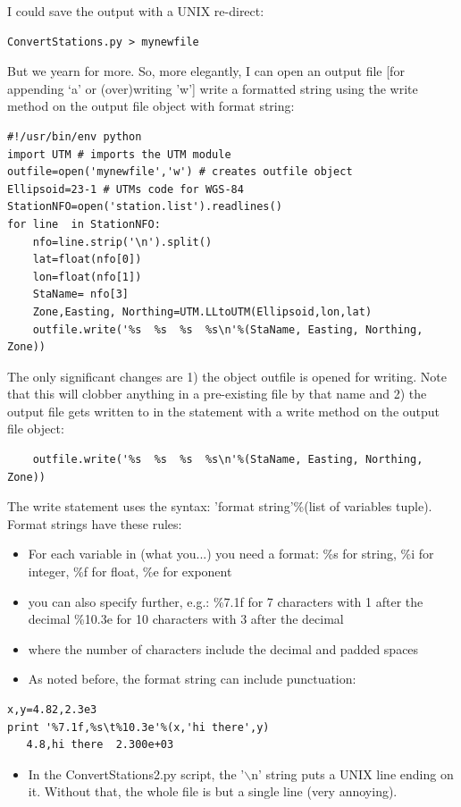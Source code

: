 \documentclass[11pt]{book}
\begin{document}
{\noindent 
I could save the output with a UNIX re-direct: 
 { \color{blue} \begin{verbatim}
ConvertStations.py > mynewfile
 \end{verbatim}}
 
But we yearn for more.  So,  more  elegantly, I can open an output file [for appending `a' or (over)writing 'w']  write a formatted string using the write method on  the output file object with format string:

 { \color{blue} \begin{verbatim}
#!/usr/bin/env python
import UTM # imports the UTM module
outfile=open('mynewfile','w') # creates outfile object
Ellipsoid=23-1 # UTMs code for WGS-84
StationNFO=open('station.list').readlines()
for line  in StationNFO:
    nfo=line.strip('\n').split()
    lat=float(nfo[0])
    lon=float(nfo[1])
    StaName= nfo[3]
    Zone,Easting, Northing=UTM.LLtoUTM(Ellipsoid,lon,lat)
    outfile.write('%s  %s  %s  %s\n'%(StaName, Easting, Northing, Zone))
\end{verbatim}}

\noindent
The only significant changes are 1) the object {\color{blue}outfile} is opened for writing. Note that this will clobber anything in a pre-existing file by that name and 2) the output file gets written to in the statement with a write method on the output file object:
{ \color{blue} \begin{verbatim}
    outfile.write('%s  %s  %s  %s\n'%(StaName, Easting, Northing, Zone))
\end{verbatim}}
\noindent
The write statement uses the syntax:  'format string'\%(list of variables tuple).  Format strings have these rules:

\begin{itemize}
\item For each variable in (what you...) you need a format:  \%s for string, \%i for integer, \%f for float, \%e for exponent
\item you can also specify further, e.g.:
\%7.1f  for 7 characters with 1 after the decimal
\%10.3e for 10 characters with 3 after the decimal
\item where the number of characters include the decimal and padded spaces
\item As noted before, the format string can include punctuation:
\end{itemize}
{ \color{blue} \begin{verbatim}
x,y=4.82,2.3e3
print '%7.1f,%s\t%10.3e'%(x,'hi there',y)
   4.8,hi there	 2.300e+03
\end{verbatim}}
\begin{itemize}
\item In the {\color{blue}ConvertStations2.py} script, the  '$\backslash$n' string puts a UNIX line ending on it.  Without that, the whole file is but a single line (very annoying).  
\end{itemize}




}
\end{document}
